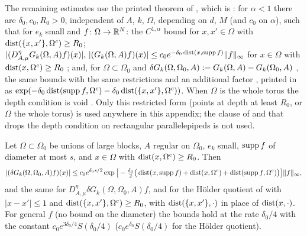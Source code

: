 
The remaining estimates use the printed theorem of \cite{Ba4}, which is \cite[Prop.~2.1]{Ba1}: for $\alpha<1$ there are $\delta_0,c_0,R_0>0$, independent of $A$, $k$, $\Omega$, depending on $d$, $M$ (and $c_0$ on $\alpha$), such that for $e_k$ small and $f\colon\Omega\to\mathbb R^N$: the $C^{1,\alpha}$ bound \cite[(1.9)]{Ba4} for $x,x'\in\Omega$ with $\operatorname{dist}(\{x,x'\},\Omega^c)\ge R_0$; $|(D^\eta_{A,\mu}G_k(\Omega,A)f)(x)|,\,|(G_k(\Omega,A)f)(x)|\le c_0e^{-\delta_0\operatorname{dist}(x,\operatorname{supp} f)}\lVert f\rVert_\infty$ for $x\in\Omega$ with $\operatorname{dist}(x,\Omega^c)\ge R_0$ \cite[(1.10)]{Ba4}; and, for $\Omega\subset\Omega_0$ and $\delta G_k(\Omega,\Omega_0,A):= G_k(\Omega,A)-G_k(\Omega_0,A)$ \cite[(1.11)]{Ba4}, the same bounds with the same restrictions and an additional factor \cite[(1.12)]{Ba4}, printed in \cite[(2.26)]{Ba1} as $\exp(-\delta_0\operatorname{dist}(\operatorname{supp} f,\Omega^c)-\delta_0\operatorname{dist}(\{x,x'\},\Omega^c))$. When $\Omega$ is the whole torus the depth condition is void \cite[p.~611]{Ba1}. Only this restricted form (points at depth at least $R_0$, or $\Omega$ the whole torus) is used anywhere in this appendix; the clause of \cite[p.~611]{Ba1} and \cite[p.~573]{Ba4} that drops the depth condition on rectangular parallelepipeds is not used.

\begin{lemma}\label{lem:a06A:twosided}
Let $\Omega\subset\Omega_0$ be unions of large blocks, $A$ regular on $\Omega_0$, $e_k$ small, $\operatorname{supp} f$ of diameter at most $s$, and $x\in\Omega$ with $\operatorname{dist}(x,\Omega^c)\ge R_0$. Then
\[
|(\delta G_k(\Omega,\Omega_0,A)f)(x)|\le c_0e^{\delta_0s/2}\exp\big[-\tfrac{\delta_0}2\big(\operatorname{dist}(x,\operatorname{supp} f)+\operatorname{dist}(x,\Omega^c)+\operatorname{dist}(\operatorname{supp} f,\Omega^c)\big)\big]\lVert f\rVert_\infty,
\]
and the same for $D^\eta_{A,\mu}\delta G_k(\Omega,\Omega_0,A)f$, and for the H\"older quotient of \cite[(1.9)]{Ba4} with $|x-x'|\le1$ and $\operatorname{dist}(\{x,x'\},\Omega^c)\ge R_0$, with $\operatorname{dist}(\{x,x'\},\cdot)$ in place of $\operatorname{dist}(x,\cdot)$. For general $f$ (no bound on the diameter) the bounds hold at the rate $\delta_0/4$ with the constant $c_0e^{3\delta_0/4}S(\delta_0/4)$ ($c_0e^{\delta_0}S(\delta_0/4)$ for the H\"older quotient).
\end{lemma}

